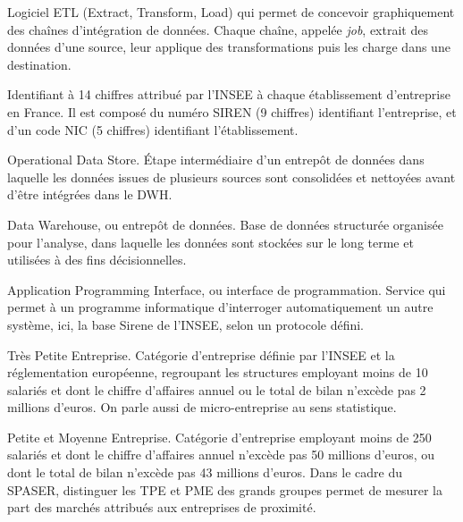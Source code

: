 \documentclass[11pt,a4paper]{article}
\begin{document}
\begin{description}[leftmargin=2.2em,style=nextline,itemsep=4pt]
\item[\hypertarget{lex:8}{}\textsuperscript{8} Talend] Logiciel ETL (Extract, Transform, Load) qui permet de concevoir graphiquement des chaînes d'intégration de données. Chaque chaîne, appelée \emph{job}, extrait des données d'une source, leur applique des transformations puis les charge dans une destination.
\item[\hypertarget{lex:9}{}\textsuperscript{9} SIRET] Identifiant à 14 chiffres attribué par l'INSEE à chaque établissement d'entreprise en France. Il est composé du numéro SIREN (9 chiffres) identifiant l'entreprise, et d'un code NIC (5 chiffres) identifiant l'établissement.
\item[\hypertarget{lex:10}{}\textsuperscript{10} ODS] Operational Data Store. Étape intermédiaire d'un entrepôt de données dans laquelle les données issues de plusieurs sources sont consolidées et nettoyées avant d'être intégrées dans le DWH.
\item[\hypertarget{lex:11}{}\textsuperscript{11} DWH] Data Warehouse, ou entrepôt de données. Base de données structurée organisée pour l'analyse, dans laquelle les données sont stockées sur le long terme et utilisées à des fins décisionnelles.
\item[\hypertarget{lex:12}{}\textsuperscript{12} API] Application Programming Interface, ou interface de programmation. Service qui permet à un programme informatique d'interroger automatiquement un autre système, ici, la base Sirene de l'INSEE, selon un protocole défini.
\item[\hypertarget{lex:13}{}\textsuperscript{13} TPE] Très Petite Entreprise. Catégorie d'entreprise définie par l'INSEE et la réglementation européenne, regroupant les structures employant moins de 10 salariés et dont le chiffre d'affaires annuel ou le total de bilan n'excède pas 2 millions d'euros. On parle aussi de micro-entreprise au sens statistique.
\item[\hypertarget{lex:14}{}\textsuperscript{14} PME] Petite et Moyenne Entreprise. Catégorie d'entreprise employant moins de 250 salariés et dont le chiffre d'affaires annuel n'excède pas 50 millions d'euros, ou dont le total de bilan n'excède pas 43 millions d'euros. Dans le cadre du SPASER, distinguer les TPE et PME des grands groupes permet de mesurer la part des marchés attribués aux entreprises de proximité.
\end{description}

\newpage
\end{document}
